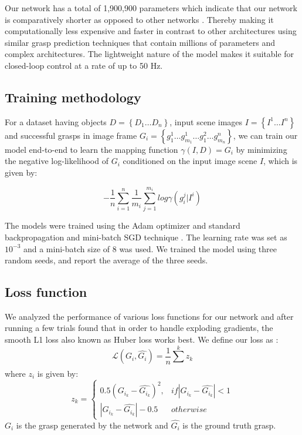 \documentclass[letterpaper, 10pt, conference]{IEEEtran}
\begin{document}
Our network has a total of 1,900,900 parameters which indicate that our network is comparatively shorter as opposed to other networks \cite{kumra2017robotic, zhou2018fully, Asif2018EnsembleNetIG}. Thereby making it computationally less expensive and faster in contrast to other architectures using similar grasp prediction techniques that contain millions of parameters and complex architectures. The lightweight nature of the model makes it suitable for closed-loop control at a rate of up to 50 Hz.

\subsection{Training methodology}
For a dataset having objects $D = \left \{ D_1 \dots D_n \right \}$, input scene images $I = \left \{ I^1 \dots I^n \right \}$ and successful grasps in image frame $G_i = \left \{ g_1^1 \dots g_{m_1}^1 \dots g_1^2 \dots g_{m_n}^n \right \}$, we can train our model end-to-end to learn the mapping function $\gamma (I , D) = G_i$ by minimizing the negative log-likelihood of $G_i$ conditioned on the input image scene $I$, which is given by:

\begin{equation}
    - \frac{1}{n} \sum_{i=1}^{n} \frac{1}{m_i} \sum_{j=1}^{m_i} log \gamma (g_i^j | I^i)
\end{equation}

The models were trained using the Adam optimizer \cite{adam2015} and standard backpropagation and mini-batch SGD technique \cite{nitanda2014stochastic}. The learning rate was set as ${10^{-3}}$ and a mini-batch size of $8$ was used. We trained the model using three random seeds, and report the average of the three seeds. 

\subsection{Loss function}
We analyzed the performance of various loss functions for our network and after running a few trials found that in order to handle exploding gradients, the smooth L1 loss also known as Huber loss works best. We define our loss as :
\begin{equation}
     \mathcal{L}(G_i, \widehat{G_i}) = \frac{1}{n} \sum_{}^{k} z_k
\end{equation}
where $z_{i}$ is given by:
\begin{equation}
    z_k = \left\{\begin{matrix}
    0.5 (G_{i_k} - \widehat{G_{i_k}})^{2}, & if \left | G_{i_k} - \widehat{G_{i_k}} \right | < 1 \\ 
    \left | G_{i_k} - \widehat{G_{i_k}} \right | - 0.5 & otherwise
    \end{matrix}\right.
\end{equation}
$G_i$ is the grasp generated by the network and $\widehat{G_i}$ is the ground truth grasp.
\end{document}
